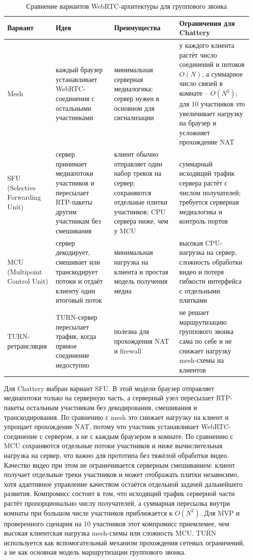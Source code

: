 \documentclass[a4paper,12pt]{extarticle}
\begin{document}
\begin{table}[htbp]
\centering
\small
\renewcommand{\arraystretch}{1.2}
\footnotesize
\begin{tabular}{|p{3cm}|p{4.2cm}|p{4.2cm}|p{4.2cm}|}
\hline
\textbf{Вариант} & \textbf{Идея} & \textbf{Преимущества} & \textbf{Ограничения для Chattery} \\
\hline
Mesh & каждый браузер устанавливает WebRTC-соединения с остальными участниками & минимальная серверная медиалогика; сервер нужен в основном для сигнализации & у каждого клиента растёт число соединений и потоков \(O(N)\), а суммарное число связей в комнате -- \(O(N^2)\); для 10 участников это увеличивает нагрузку на браузер и усложняет прохождение NAT \\
\hline
SFU (Selective Forwarding Unit) & сервер принимает медиапотоки участников и пересылает RTP-пакеты другим участникам без смешивания & клиент обычно отправляет один набор треков на сервер; сохраняются отдельные плитки участников; CPU сервера ниже, чем у MCU & суммарный исходящий трафик сервера растёт с числом получателей; требуется серверная медиалогика и контроль портов \\
\hline
MCU (Multipoint Control Unit) & сервер декодирует, смешивает или транскодирует потоки и отдаёт клиенту один итоговый поток & минимальная нагрузка на клиента и простая модель получения медиа & высокая CPU-нагрузка на сервер, сложность обработки видео и потеря гибкости интерфейса с отдельными плитками \\
\hline
TURN-ретрансляция & TURN-сервер пересылает трафик, когда прямое соединение недоступно & полезна для прохождения NAT и firewall & не решает маршрутизацию группового звонка сама по себе и не снижает нагрузку mesh-схемы на клиентов \\
\hline
\end{tabular}
\caption{Сравнение вариантов WebRTC-архитектуры для группового звонка}
\label{tab:webrtc_arch_choices}
\end{table}

Для Chattery выбран вариант SFU. В этой модели браузер отправляет медиапотоки только на серверную часть, а серверный узел пересылает RTP-пакеты остальным участникам без декодирования, смешивания и транскодирования. По сравнению с mesh это снижает нагрузку на клиент и упрощает прохождение NAT, потому что участник устанавливает WebRTC-соединение с сервером, а не с каждым браузером в комнате. По сравнению с MCU сохраняются отдельные потоки участников и ниже вычислительная нагрузка на сервер, что важно для прототипа без тяжёлой обработки видео. Качество видео при этом не ограничивается серверным смешиванием: клиент получает отдельные треки участников и может отображать плитки независимо, хотя адаптивное управление качеством остаётся отдельной задачей дальнейшего развития. Компромисс состоит в том, что исходящий трафик серверной части растёт пропорционально числу получателей, а суммарная пересылка внутри комнаты при большом числе участников приближается к \(O(N^2)\). Для MVP и проверенного сценария на 10 участников этот компромисс приемлемее, чем высокая клиентская нагрузка mesh-схемы или сложность MCU. TURN используется как вспомогательный механизм прохождения сетевых ограничений, а не как основная модель маршрутизации группового звонка.
\end{document}
